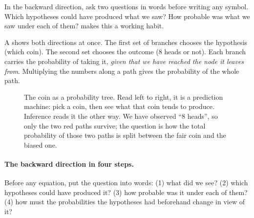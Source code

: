 In the backward direction, ask two questions in words before writing any
symbol. Which hypotheses could have produced what we saw? How probable was
what we saw under each of them?  makes this a working habit.

A  shows both directions at once. The first set of
branches chooses the hypothesis (which coin). The second set chooses the
outcome (8 heads or not). Each branch carries the probability of taking it,
\emph{given that we have reached the node it leaves from}. Multiplying the
numbers along a path gives the probability of the whole path.

\begin{figure}[htbp]
\centering
{}
\caption{The coin as a probability tree. Read left to right, it is a
prediction machine: pick a coin, then see what that coin tends to produce.
Inference reads it the other way. We have observed ``8 heads'', so only the
two red paths survive; the question is how the total probability of those two
paths is split between the fair coin and the biased one.}
\label{0a:fig:coin-tree}
\end{figure}

\paragraph{The backward direction in four steps.}
Before any equation, put the question into words: (1) what did we see?
(2) which hypotheses could have produced it? (3) how probable was it under each
of them? (4) how must the probabilities the hypotheses had beforehand change in
view of it?

